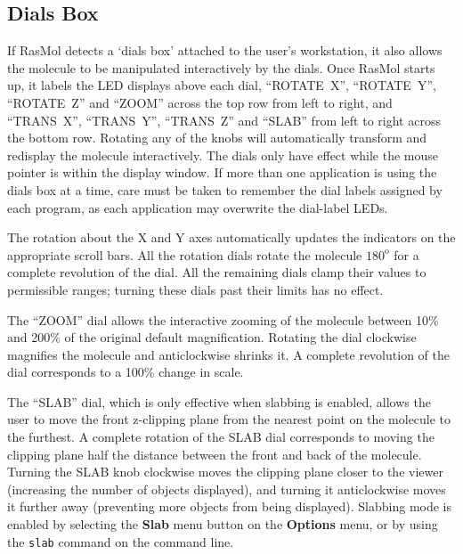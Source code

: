 \subsection{Dials Box}
\label{Dials}
If RasMol detects a `dials box' attached to the user's workstation, it
also allows the molecule to be manipulated interactively by the dials.
Once RasMol starts up, it labels the LED displays above each dial,
``ROTATE~X'', ``ROTATE~Y'', ``ROTATE~Z'' and ``ZOOM'' across the top
row from left to right, and ``TRANS~X'', ``TRANS~Y'', ``TRANS~Z'' and
``SLAB'' from left to right across the bottom row. Rotating any of the
knobs will automatically transform and redisplay the molecule 
interactively. The dials only have effect while the mouse pointer is
within the display window. If more than one application is using the
dials box at a time, care must be taken to remember the dial labels
assigned by each program, as each application may overwrite the 
dial-label LEDs.

The rotation about the X and Y axes automatically updates the indicators 
on the appropriate scroll bars. All the rotation dials rotate the molecule 
$180^{\mbox{o}}$ for a complete revolution of the dial. All the remaining 
dials clamp their values to permissible ranges; turning these dials past 
their limits has no effect. 

The ``ZOOM'' dial allows the interactive zooming of the molecule between 
10\% and 200\% of the original default magnification. Rotating the dial 
clockwise magnifies the molecule and anticlockwise shrinks it. A complete 
revolution of the dial corresponds to a 100\% change in scale.

The ``SLAB'' dial, which is only effective when slabbing is enabled, allows
the user to move the front z-clipping plane from the nearest point on the
molecule to the furthest. A complete rotation of the SLAB dial corresponds
to moving the clipping plane half the distance between the front and back of
the molecule. Turning the SLAB knob clockwise moves the clipping plane
closer to the viewer (increasing the number of objects displayed), and turning
it anticlockwise moves it further away (preventing more objects from being
displayed). Slabbing mode is enabled by selecting the {\bf Slab} menu button 
on the {\bf Options} menu, or by using the {\tt slab} command on the command 
line. 

